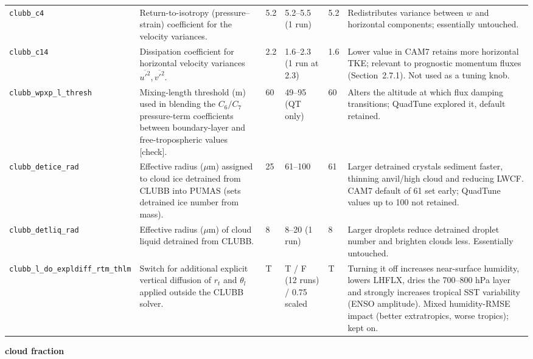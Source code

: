 \documentclass[draft]{agujournal2019}
\begin{document}
\begin{tabular}{p{2.3cm} p{3.1cm} p{0.9cm} p{1.8cm} p{1.0cm} p{4.2cm}}
\texttt{clubb\_\allowbreak c4} &
Return-to-isotropy (pressure--strain) coefficient for the velocity
variances. &
5.2 & 5.2--5.5 (1 run) & 5.2 &
Redistributes variance between $w$ and horizontal components; essentially
untouched. \\

\texttt{clubb\_\allowbreak c14} &
Dissipation coefficient for horizontal velocity variances
$\overline{u'^2},\overline{v'^2}$. &
2.2 & 1.6--2.3 (1 run at 2.3) & 1.6 &
Lower value in CAM7 retains more horizontal TKE; relevant to prognostic
momentum fluxes (Section~2.7.1). Not used as a tuning knob. \\

\texttt{clubb\_\allowbreak wpxp\_\allowbreak l\_\allowbreak thresh} &
Mixing-length threshold (m) used in blending the $C_6/C_7$ pressure-term
coefficients between boundary-layer and free-tropospheric values [check]. &
60 & 49--95 (QT only) & 60 &
Alters the altitude at which flux damping transitions; QuadTune explored it,
default retained. \\

\texttt{clubb\_\allowbreak detice\_\allowbreak rad} &
Effective radius ($\mu$m) assigned to cloud ice detrained from CLUBB into
PUMAS (sets detrained ice number from mass). &
25 & 61--100 & 61 &
Larger detrained crystals sediment faster, thinning anvil/high cloud and
reducing LWCF. CAM7 default of 61 set early; QuadTune values up to 100 not
retained. \\

\texttt{clubb\_\allowbreak detliq\_\allowbreak rad} &
Effective radius ($\mu$m) of cloud liquid detrained from CLUBB. &
8 & 8--20 (1 run) & 8 &
Larger droplets reduce detrained droplet number and brighten clouds less.
Essentially untouched. \\

\texttt{clubb\_\allowbreak l\_\allowbreak do\_\allowbreak expldiff\_\allowbreak rtm\_\allowbreak thlm} &
Switch for additional explicit vertical diffusion of $r_t$ and $\theta_l$
applied outside the CLUBB solver. &
T & T / F (12 runs) / 0.75 scaled & T &
Turning it off increases near-surface humidity, lowers LHFLX, dries the
700--800 hPa layer and strongly increases tropical SST variability (ENSO
amplitude). Mixed humidity-RMSE impact (better extratropics, worse tropics);
kept on. \\
 \hline
 \hline
 \end{tabular}
\normalsize


\newpage
\noindent\textbf{cloud fraction}
\medskip
\end{document}
